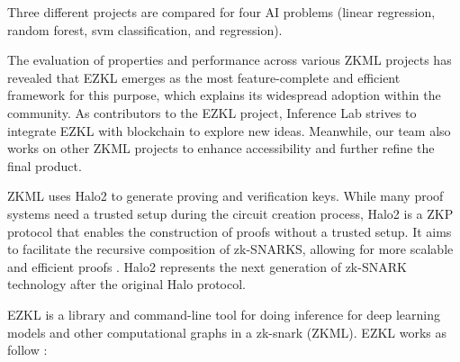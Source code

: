 \documentclass[conference]{IEEEtran}
\begin{document}
Three different projects are compared for four AI problems (linear regression, random forest, svm classification, and regression).



The evaluation of properties and performance across various ZKML projects has revealed that EZKL emerges as the most feature-complete and efficient framework for this purpose, which explains its widespread adoption within the community. As contributors to the EZKL project, Inference Lab strives to integrate EZKL with blockchain to explore new ideas. Meanwhile, our team also works on other ZKML projects to enhance accessibility and further refine the final product.

ZKML uses Halo2 to generate proving and verification keys. While many proof systems need a trusted setup during the circuit creation process, Halo2 is a ZKP protocol that enables the construction of proofs without a trusted setup. It aims to facilitate the recursive composition of zk-SNARKS, allowing for more scalable and efficient proofs \cite{ZcashHalo2GH}. Halo2 represents the next generation of zk-SNARK technology after the original Halo protocol.

EZKL is a library and command-line tool for doing inference for deep learning models and other computational graphs in a zk-snark (ZKML). EZKL works as follow \cite{ZconduitEZKLGH}:
\end{document}
